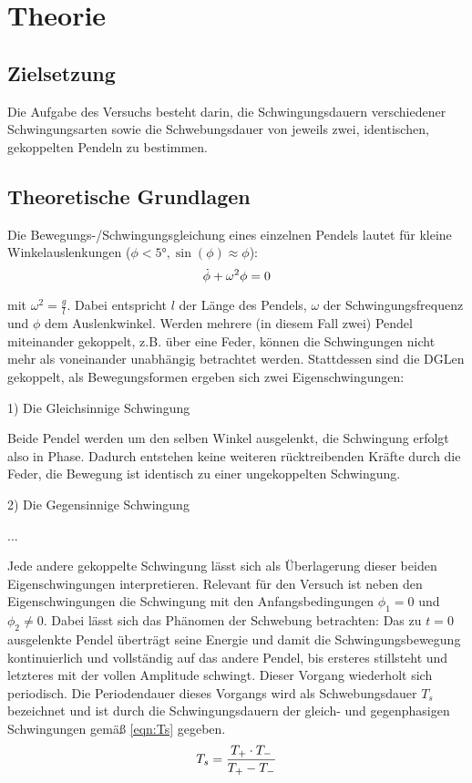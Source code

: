 \section{Theorie}
\label{sec:Theorie}

\subsection{Zielsetzung}
Die Aufgabe des Versuchs besteht darin, die Schwingungsdauern verschiedener
Schwingungsarten sowie die Schwebungsdauer von jeweils zwei, identischen,
gekoppelten Pendeln zu bestimmen.
\subsection{Theoretische Grundlagen}
Die Bewegungs-/Schwingungsgleichung eines einzelnen Pendels lautet für kleine
Winkelauslenkungen ($\phi < \ang{5}, \sin(\phi) \approx \phi$):
\begin{equation}
  \centering
  \dot{\phi}+ \omega^2 \phi = 0
  \label{eqn:schwgl}
\end{equation}

mit $\omega ^2 = \frac{g}{l}.$
Dabei entspricht $l$ der Länge des Pendels, $\omega$ der Schwingungsfrequenz und
$\phi$ dem Auslenkwinkel.
Werden mehrere (in diesem Fall zwei) Pendel miteinander gekoppelt, z.B. über
eine Feder, können die Schwingungen nicht mehr als voneinander unabhängig
betrachtet werden. Stattdessen sind die DGLen gekoppelt, als
Bewegungsformen ergeben sich zwei Eigenschwingungen:

1) Die Gleichsinnige Schwingung

Beide Pendel werden um den selben Winkel ausgelenkt, die Schwingung erfolgt
also in Phase. Dadurch entstehen keine weiteren rücktreibenden Kräfte durch
die Feder, die Bewegung ist identisch zu einer ungekoppelten Schwingung.

2) Die Gegensinnige Schwingung

...

Jede andere gekoppelte Schwingung lässt sich als Überlagerung dieser beiden
Eigenschwingungen interpretieren. Relevant für den Versuch ist neben den
Eigenschwingungen die Schwingung mit den Anfangsbedingungen
$\phi_1 = 0$ und $\phi_2 \neq 0$.
Dabei lässt sich das Phänomen der Schwebung betrachten: Das zu $t = 0$
ausgelenkte Pendel überträgt seine Energie und damit die Schwingungsbewegung
kontinuierlich und vollständig
auf das andere Pendel, bis ersteres stillsteht und letzteres
mit der vollen Amplitude schwingt. Dieser Vorgang wiederholt sich periodisch.
Die Periodendauer dieses Vorgangs wird als Schwebungsdauer $T_s$ bezeichnet und
ist durch die Schwingungsdauern der gleich- und gegenphasigen Schwingungen
gemäß \ref{eqn:Ts} gegeben.
\begin{equation}
  \centering
  T_s  = \frac{T_+ \cdot T_-}{T_+ - T_-}
  \label{eqn:Ts}
\end{equation}
